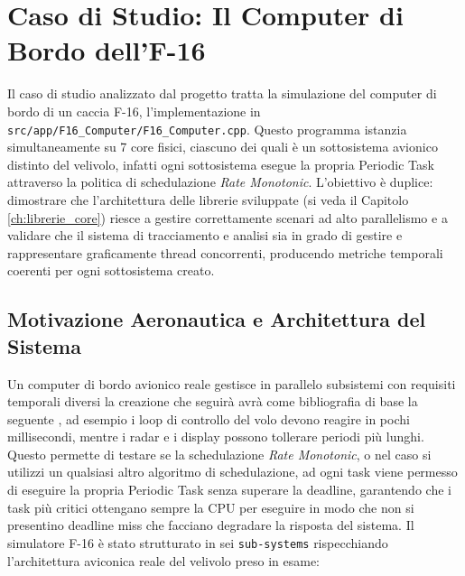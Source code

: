 \chapter{Caso di Studio: Il Computer di Bordo dell'F-16}
\label{ch:f16_computer}
\label{sec:caso_di_studio}
Il caso di studio analizzato dal progetto tratta la simulazione del computer di bordo di un caccia F-16, l'implementazione in \texttt{src/app/F16\_Computer/F16\_Computer.cpp}. Questo programma istanzia simultaneamente su 7 core fisici, ciascuno dei quali è un sottosistema avionico distinto del velivolo, infatti ogni sottosistema esegue la propria Periodic Task attraverso la politica di schedulazione \textit{Rate Monotonic}.
L'obiettivo è duplice: dimostrare che l'architettura delle librerie sviluppate (si veda il Capitolo \ref{ch:librerie_core}) riesce a gestire correttamente scenari ad alto parallelismo e a validare che il sistema di tracciamento e analisi sia in grado di gestire e rappresentare graficamente thread concorrenti, producendo metriche temporali coerenti per ogni sottosistema creato.

\clearpage
\section{Motivazione Aeronautica e Architettura del Sistema}
Un computer di bordo avionico reale gestisce in parallelo subsistemi con requisiti temporali diversi la creazione che seguirà avrà come bibliografia di base la seguente 	\cite{Scheduling_Real_Time}, ad esempio i loop di controllo del volo devono reagire in pochi millisecondi, mentre i radar e i display possono tollerare periodi più lunghi. Questo permette di testare se la schedulazione \textit{Rate Monotonic}, o nel caso si utilizzi un qualsiasi altro algoritmo di schedulazione, ad ogni task viene permesso di eseguire la propria Periodic Task senza superare la deadline, garantendo che i task più critici ottengano sempre la CPU per eseguire in modo che non si presentino deadline miss che facciano degradare la risposta del sistema.
Il simulatore F-16 è stato strutturato in sei \texttt{sub-systems} rispecchiando l'architettura aviconica reale del velivolo preso in esame:

